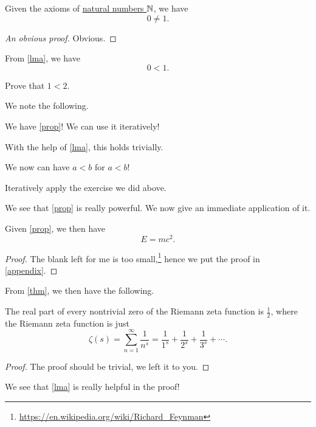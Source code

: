 \begin{lemma}\label{lma}
	Given the axioms of \hyperref[def]{natural numbers \(\mathbb{\MakeUppercase{n}} \)}, we have
	\[
		0\neq 1. 
	\]
\end{lemma}
\begin{proof}[An obvious proof]
	Obvious.
\end{proof}
\begin{proposition}\label{prop}
	From \autoref{lma}, we have
	\[
		0<1.
	\]
\end{proposition}
\begin{exercise}
	Prove that \(1 < 2\).
\end{exercise}
\begin{answer}
	We note the following.
	\begin{note}
		We have \autoref{prop}! We can use it iteratively!
	\end{note}
	With the help of \autoref{lma}, this holds trivially.
\end{answer}
\begin{eg}
	We now can have \(a < b\) for \(a < b\)!
\end{eg}
\begin{explanation}
	Iteratively apply the exercise we did above.
\end{explanation}
\begin{remark}
	We see that \autoref{prop} is really powerful. We now give an immediate application of it.
\end{remark}

\begin{theorem}\label{thm}
	Given \autoref{prop}, we then have
	\[
		E = mc^2.
	\]
\end{theorem}
\begin{proof}
	The blank left for me is too small,\footnote{\url{https://en.wikipedia.org/wiki/Richard_Feynman}} hence we put the proof in \autoref{appendix}.
\end{proof}

From \autoref{thm}, we then have the following.
\begin{corollary}\label{col}
	The real part of every nontrivial zero of the Riemann zeta function is \(\frac{1}{2}\), where the Riemann zeta function is just
	\[
		\zeta (s)=\sum _{n=1}^{\infty }{\frac {1}{n^{s}}}={\frac {1}{1^{s}}}+{\frac {1}{2^{s}}}+{\frac {1}{3^{s}}}+\cdots.
	\]
\end{corollary}
\begin{proof}
	The proof should be trivial, we left it to you.
\end{proof}
\begin{prev}
	We see that \autoref{lma} is really helpful in the proof!
\end{prev}

